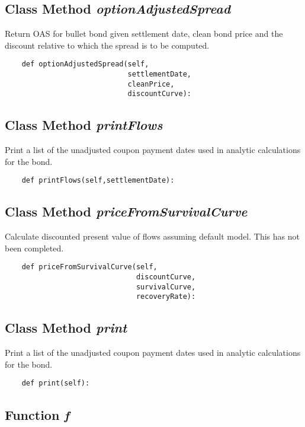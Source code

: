 \documentclass[twoside,11pt]{book}
\begin{document}
\subsection{Class Method {\it optionAdjustedSpread}}
Return OAS for bullet bond given settlement date, clean bond price and the discount relative to which the spread is to be computed. 

\begin{lstlisting}
    def optionAdjustedSpread(self, 
                             settlementDate, 
                             cleanPrice, 
                             discountCurve):
\end{lstlisting}

\subsection{Class Method {\it printFlows}}
Print a list of the unadjusted coupon payment dates used in analytic calculations for the bond. 

\begin{lstlisting}
    def printFlows(self,settlementDate):
\end{lstlisting}

\subsection{Class Method {\it priceFromSurvivalCurve}}
Calculate discounted present value of flows assuming default model. This has not been completed. 

\begin{lstlisting}
    def priceFromSurvivalCurve(self, 
                               discountCurve, 
                               survivalCurve, 
                               recoveryRate):
\end{lstlisting}

\subsection{Class Method {\it print}}
Print a list of the unadjusted coupon payment dates used in analytic calculations for the bond. 

\begin{lstlisting}
    def print(self):
\end{lstlisting}

\subsection{Function {\it f}}
\end{document}
